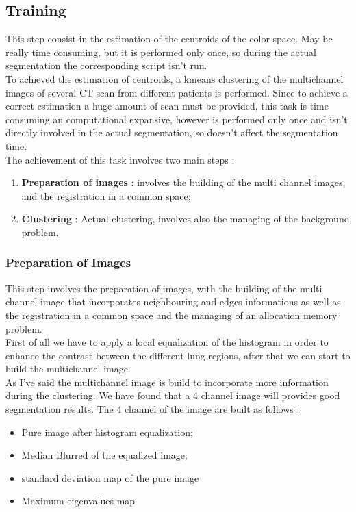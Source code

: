 
	
	\subsection{Training}
	
	This step consist in the estimation of the centroids of the color space. May be  really time consuming, but it is performed only once, so during the actual segmentation the corresponding script isn't run.\\
	To achieved the estimation of centroids, a kmeans clustering of the multichannel images of several CT scan from different patients is performed. 
	Since to achieve a correct estimation a huge amount of scan must be provided, this task is time consuming an computational expansive, however is performed only once and isn't directly involved in the actual segmentation, so doesn't affect the segmentation time.\\
	The achievement of this task involves two main steps : 
	\begin{enumerate}
		\item \textbf{Preparation of images} : involves the building of the multi channel images, and the registration in a common space; 
		\item \textbf{Clustering} : Actual clustering, involves also the managing of the background problem.
	\end{enumerate}

		\subsubsection*{Preparation of Images} 
	
		This step involves the preparation of images, with the building of the multi channel image that incorporates neighbouring and edges informations as well as the registration in a common space and the managing of an allocation memory problem.\\
		
		First of all we have to apply a local equalization of the histogram in order to enhance the contrast between the different lung regions, after that we can start to build the multichannel image.\\		
		As I've said the multichannel image is build to incorporate more information during the clustering. We have found that a 4 channel image will provides good segmentation results. The 4 channel of the image are built as follows  : 
		\begin{itemize}
			\item Pure image after histogram equalization; 
			\item Median Blurred of the equalized image; 
			\item standard deviation map of the pure image
			\item Maximum eigenvalues map 
		\end{itemize}
	

